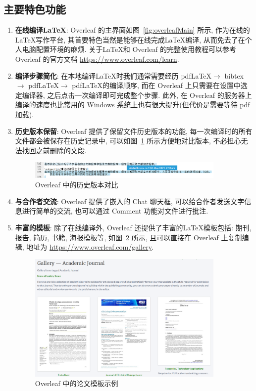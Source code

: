 \documentclass{formatBook}
\begin{document}
\subsection{主要特色功能}\label{subsection:features}

\begin{enumerate}
    \item \textbf{在线编译\LaTeX }: Overleaf 的主界面如图~\ref{fig:overleafMain} 所示, 作为在线的\LaTeX 写作平台, 其首要特色当然是能够在线完成\LaTeX 编译, 从而免去了在个人电脑配置环境的麻烦. 关于\LaTeX 和 Overleaf 的完整使用教程可以参考 Overleaf 的官方文档 \url{https://www.overleaf.com/learn}.
    \item \textbf{编译步骤简化}: 在本地编译\LaTeX 时我们通常需要经历 pdf\LaTeX $\rightarrow$ bibtex $\rightarrow$ pdf\LaTeX $\rightarrow$ pdf\LaTeX 的编译顺序, 而在 Overleaf 上只需要在设置中选定编译器, 之后点击一次编译即可完成整个步骤. 此外, 在 Overleaf 的服务器上编译的速度也比常用的 Windows 系统上也有很大提升(但代价是需要等待 pdf 加载).
    \item \textbf{历史版本保留}: Overleaf 提供了保留文件历史版本的功能, 每一次编译时的所有文件都会被保存在历史记录中, 可以如图~\ref{fig:history} 所示方便地对比版本, 不必担心无法找回之前删除的文段.
          \begin{figure}[H]
              \centering
              \includegraphics[width=0.9\textwidth]{figure/history.png}
              \caption{Overleaf 中的历史版本对比}
              \label{fig:history}
          \end{figure}
    \item \textbf{与合作者交流}: Overleaf 提供了嵌入的 Chat 聊天框, 可以给合作者发送文字信息进行简单的交流, 也可以通过 Comment 功能对文件进行批注.
    \item \textbf{丰富的模板}: 除了在线编译外, Overleaf 还提供了丰富的\LaTeX 模板包括: 期刊, 报告, 简历, 书籍, 海报模板等, 如图~\ref{fig:template} 所示, 且可以直接在 Overleaf 上复制编辑, 地址为 \url{https://www.overleaf.com/gallery}.
          \begin{figure}[htbp]
              \centering
              \includegraphics[width=0.9\textwidth]{figure/template.png}
              \caption{Overleaf 中的论文模板示例}
              \label{fig:template}
          \end{figure}
\end{enumerate}
\end{document}
